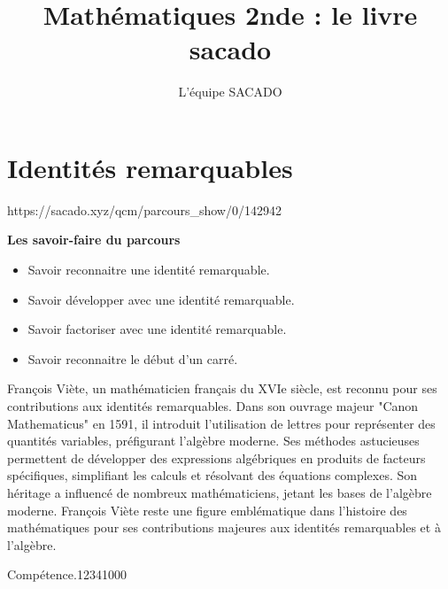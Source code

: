 



\title{Mathématiques 2nde  : le livre sacado}
\author{L'équipe SACADO}




\chapter{Identités remarquables}
{https://sacado.xyz/qcm/parcours_show/0/142942}
{
 \begin{CpsCol}
	\textbf{Les savoir-faire du parcours}
 	\begin{itemize}
 		\item Savoir reconnaitre une identité remarquable.
		\item Savoir développer avec une identité remarquable.
		\item Savoir factoriser avec une identité remarquable.
		\item Savoir reconnaitre le début d'un carré.
 	\end{itemize}
 \end{CpsCol}

\begin{His}
	François Viète, un mathématicien français du XVIe siècle, est reconnu pour ses contributions aux identités remarquables. Dans son ouvrage majeur "Canon Mathematicus" en 1591, il introduit l'utilisation de lettres pour représenter des quantités variables, préfigurant l'algèbre moderne. Ses méthodes astucieuses permettent de développer des expressions algébriques en produits de facteurs spécifiques, simplifiant les calculs et résolvant des équations complexes. Son héritage a influencé de nombreux mathématiciens, jetant les bases de l'algèbre moderne. François Viète reste une figure emblématique dans l'histoire des mathématiques pour ses contributions majeures aux identités remarquables et à l'algèbre.
\end{His}

\begin{ExoDec}{Compétence.}{1234}{1}{0}{0}{0}
\end{ExoDec}
}


